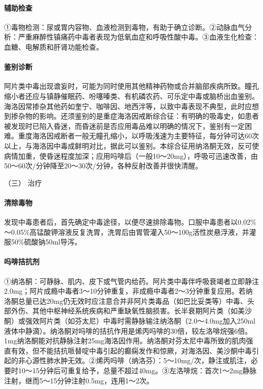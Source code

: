 \paragraph{辅助检查}

①毒物检测：尿或胃内容物、血液检测到毒物，有助于确立诊断。②动脉血气分析：严重麻醉性镇痛药中毒者表现为低氧血症和呼吸性酸中毒。③血液生化检查：血糖、电解质和肝肾功能检查。

\paragraph{鉴别诊断}

阿片类中毒出现谵妄时，可能为同时使用其他精神药物或合并脑部疾病所致。瞳孔缩小者还应与镇静催眠药、吩噻嗪类、有机磷农药、可乐定中毒或脑桥出血鉴别。海洛因常掺杂其他药如奎宁、咖啡因、地西泮等，以致中毒表现不典型，此时应想到掺杂物的影响。还须鉴别的是重症海洛因戒断综合征：有明确的吸毒史，如患者被发现时已陷入昏迷，而昏迷前是否应用毒品难以明确的情况下，鉴别有一定困难。重度海洛因戒断者一般无瞳孔缩小，以呼吸浅速为主要特征，每分钟可达60次以上，与海洛因中毒成鲜明对比，据此可以鉴别。本综合征用纳洛酮无效，反可使病情加重，使昏迷程度加深；应用吗啡后（一般10～20mg），呼吸可迅速改善，由50～60次/分钟降至20～30次/分钟，各种反射改善并很快清醒。

\hypertarget{text00131.htmlux5cux23CHP5-2-1-1-3}{}
（三） 治疗

\paragraph{清除毒物}

发现中毒患者后，首先确定中毒途径，以便尽速排除毒物。口服中毒患者以0.02\%～0.05\%高锰酸钾溶液反复洗胃，洗胃后由胃管灌入50～100g活性炭悬浮液，并灌服50\%硫酸钠50ml导泻。

\paragraph{吗啡拮抗剂}

①纳洛酮：可静脉、肌内、皮下或气管内给药。阿片类中毒伴呼吸衰竭者立即静注2.0mg；阿片成瘾中毒者3～10分钟重复，非成瘾中毒者2～3分钟重复应用。若纳洛酮总量已达20mg仍无效时应注意合并非阿片类毒品（如巴比妥类等）中毒、头部外伤、其他中枢神经系统疾病和严重缺氧性脑损害。长半衰期阿片类（如美沙酮）或强效阿片类（如芬太尼）中毒时需静脉输注纳洛酮（2.0～4.0mg加入250ml液体中静滴）。纳洛酮对吗啡的拮抗作用是烯丙吗啡的30倍，较左洛啡烷强6倍。1mg纳洛酮能对抗静脉注射25mg海洛因作用。纳洛酮对芬太尼中毒所致的肌肉强直有效，但不能拮抗哌替啶中毒引起的癫痫发作和惊厥，对海洛因、美沙酮中毒引起的非心源性肺水肿无效。②烯丙吗啡（纳洛芬）：5～10mg/次，静注或肌注，必要时10～15分钟后可重复给予，总量不超过40mg。③左洛啡烷：首次1～2mg静脉注射，继而5～15分钟注射0.5mg，连用1～2次。

